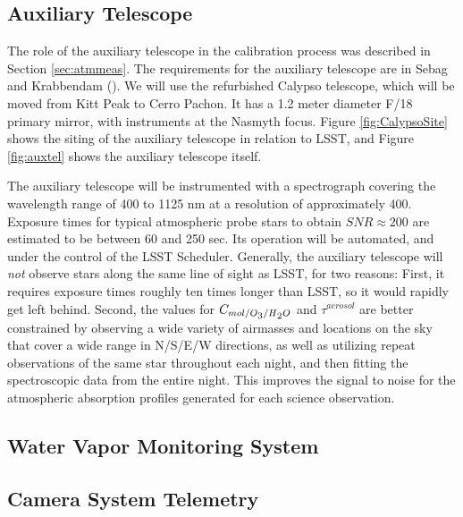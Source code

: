 \documentclass[12pt,preprint]{aastex}
\newcommand{\water}   {H\textsubscript{2}O}
\newcommand{\ozone}    {O\textsubscript{3}}
\begin{document}
\subsection{Auxiliary Telescope}

The role of the auxiliary telescope in the calibration process was described in Section \ref{sec:atmmeas}.
The requirements for the auxiliary telescope are in Sebag and Krabbendam (\citep{LSE-60}).  We will use
the refurbished Calypso telescope, which will be moved from Kitt Peak to Cerro Pachon.  It has a 1.2 meter
diameter F/18 primary mirror, with instruments at the Nasmyth focus.  Figure \ref{fig:CalypsoSite}
shows the siting of the auxiliary telescope in relation to LSST, and Figure \ref{fig:auxtel} shows the auxiliary
telescope itself.

The auxiliary telescope will be instrumented with a spectrograph covering the wavelength range of 400 to 1125 nm at
a resolution of approximately 400.  Exposure times for typical atmospheric probe stars to 
obtain $SNR \approx 200$ are estimated to be between 60 and 250 sec.
Its operation will be automated, and under the control of the LSST Scheduler.
Generally, the auxiliary telescope will {\it not} observe stars along the
same line of sight as LSST, for two reasons:  First, it requires exposure times roughly
ten times longer than LSST, so it would rapidly get left behind.  Second, the values for
$C_{mol/\ozone/\water}$ and $\tau^{aerosol}$ are better
constrained by observing a wide variety of airmasses and locations on
the sky that cover a wide range in N/S/E/W directions, as well as utilizing
repeat observations of the same star throughout each night, and then
fitting the spectroscopic data from the entire night. This improves the 
signal to noise for the atmospheric absorption profiles generated for each science observation.





\subsection{Water Vapor Monitoring System}

\subsection{Camera System Telemetry}
\end{document}
